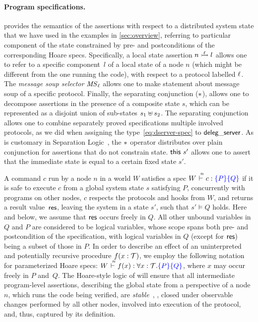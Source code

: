 \paragraph{Program specifications.~}

 provides the semantics of the assertions with
respect to a distributed system state that we have used in the
examples in \cref{sec:overview}, referring to particular
component of the state constrained by pre- and postconditions of the
corresponding Hoare specs.
%
Specifically, a local state assertion $n \ppts{\lab} l$ allows one to
refer to a specific component~$l$ of a local state of a node $n$
(which might be different from the one running the code), with respect
to a protocol labelled $\ell$. The \emph{message soup selector}
$\mathit{MS}_{\ell}$ allows one to make statement about message soup of a
specific protocol. Finally, the separating conjunction ($\ast$),
allows one to decompose assertions in the presence of a composite state
$s$, which can be represented as a disjoint union of sub-states
$s_1 \uplus s_2$.
%
The separating conjunction allows one to combine separately proved
specifications \wrt multiple involved protocols, as we did when
assigning the type~\eqref{eq:dserver-spec} to $\mathsf{deleg\_server}$.
%
As is customary in Separation Logic~\cite{Reynolds:LICS02}, the
$\ast$ operator distributes over plain conjunction for assertions
that do not constrain state.
%
$\mathsf{this}~{s'}$ allows one to assert that the immediate state is equal
to a certain fixed state $s'$.


A command $c$ run by a node $n$ in a world $W$ satisfies a spec
$W \vd{n} c : \pre{P}\post{Q}$ if it is safe to execute $c$ from a
global system state $s$ satisfying $P$, concurrently with programs on
other nodes, $c$ respects the protocols and hooks from $W$, and
returns a result value~$\mathsf{res}$, leaving the system in a state $s'$,
such that $s' \vDash Q$ holds.
%
Here and below, we assume that $\mathsf{res}$ occurs freely in $Q$. All other
unbound variables in $Q$ and $P$ are considered to be logical
variables, whose scope spans both pre- and postcondition of the
specification, with logical variables in $Q$ (except for $\mathsf{res}$) being
a subset of those in $P$.
%
In order to describe an effect of an uninterpreted and potentially
recursive procedure $f(x : \mathcal{T})$, we employ the following notation
for parameterized Hoare specs:
$W \vd{n} f(x) : \forall x : \Type. \pre{P}\post{Q}$, where $x$ may
occur freely in $P$ and~$Q$.
%
The Hoare-style logic of \disel will ensure that all intermediate
program-level assertions, describing the global state from a
perspective of a node $n$, which runs the code being verified, are
\emph{stable}~\cite{Jones:TOPLAS83,Vafeiadis-Parkinson:CONCUR07}, \ie,
closed under observable changes performed by all other nodes, involved
into execution of the protocol, and, thus, captured by its definition.
%

